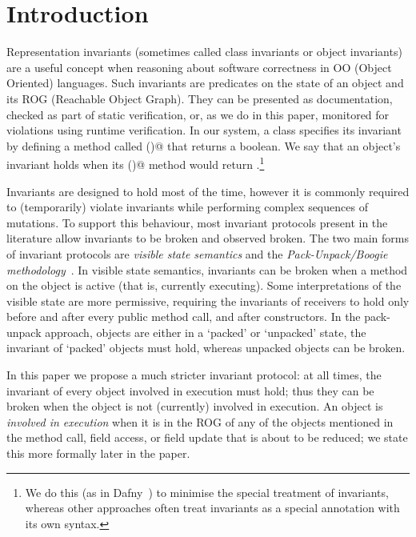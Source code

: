 \section{Introduction}
\label{s:intro}
Representation invariants (sometimes called class invariants or object invariants) are
a useful concept when reasoning about software correctness in OO (Object Oriented) languages. Such invariants are predicates on the state of an object and its ROG (Reachable Object Graph).
They can be presented as documentation, checked as part of static verification, or, as we do in this paper, monitored for violations using runtime verification.
In our system, a class specifies its invariant by defining a method called \Q@invariant()@
that returns a boolean.
We say that an object's invariant holds when its \Q@invariant()@ method would return \Q@true@.\footnote{We do this (as in Dafny~\cite{DBLP:conf/sigada/Leino12}) to minimise the special treatment of invariants, whereas other approaches often treat invariants as a special annotation with its own syntax.}

Invariants are designed to hold most of the time, however it is commonly required to (temporarily) violate invariants while performing complex sequences of mutations.
To support this behaviour, most invariant protocols present in the literature allow invariants to be broken and observed broken.
The two main forms of invariant protocols are \emph{visible state semantics} \cite{Meyer:1988:OSC:534929} and the \emph{Pack-Unpack/Boogie methodology}~\cite{DBLP:journals/jot/BarnettDFLS04}.
In visible state semantics, invariants can be broken when a method on the object is active (that is, currently executing).
Some interpretations of the visible state are more permissive, requiring the invariants of receivers to hold only before and after every public method call, and after constructors. 
In the pack-unpack approach, objects are either in a `packed' or `unpacked' state, 
the invariant of `packed' objects must hold, whereas unpacked objects can be broken.

In this paper we propose a much stricter invariant protocol: at all times, the invariant of every object involved in execution must hold; thus they can be broken when the object is not (currently) involved in execution. 
An object is \emph{involved in execution} when it is in the ROG of any of the objects mentioned in the method call, field access, or field update that is about to be reduced; we state this more formally later in the paper.


